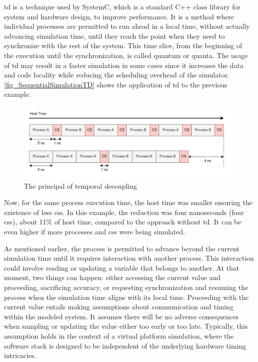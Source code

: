 \gls{td} \cite{systemC} is a technique used by SystemC, which is a standard C++ class
library for system and hardware design, to improve performance. It is a method where individual 
processes are permitted to run ahead in a local time, without actually advancing simulation time, until they reach the point when they need to 
synchronize with the rest of the system. This time slice, from the beginning of the execution until the synchronization, is called 
quantum or quanta. The usage of \gls{td} may result in a faster simulation in some cases since it increases the data and code locality while 
reducing the scheduling overhead of the simulator. \autoref{fig_SequentialSimulationTD} shows the application of \gls{td} to the previous example. 

\begin{figure}[H]
	\centering
 	\includegraphics[width=0.8\linewidth]{Images/SequentialSimulationTD.png}
 	\caption{The principal of temporal decoupling}
	 \label{fig_SequentialSimulationTD}
\end{figure}

Now, for the same process execution time, the host time was smaller ensuring the existence of less \glspl{cs}. In this example, the reduction 
was four nanoseconds (four \glspl{cs}), about 11\% of host time, compared to the approach without \gls{td}. It can be even higher if more 
processes and \glspl{cs} were being simulated.


As mentioned earlier, the process is permitted to advance beyond the current simulation time until it requires interaction with another process. 
This interaction could involve reading or updating a variable that belongs to another. At that moment, two things can happen: either accessing 
the current value and proceeding, sacrificing accuracy, or requesting synchronization and resuming the process when the simulation time aligns 
with its local time. Proceeding with the current value entails making assumptions about communication and timing within the modeled system. 
It assumes 
there will be no adverse consequences when sampling or updating the value either too early or too late. Typically, this assumption holds in 
the context of a virtual platform simulation, where the software stack is designed to be independent of the underlying hardware 
timing intricacies.

